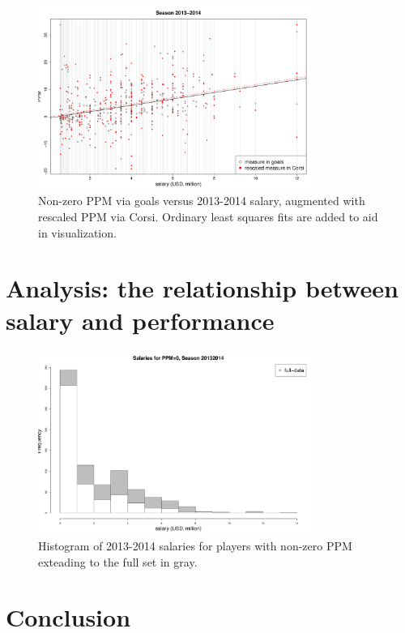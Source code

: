 \begin{figure}[htb!]
    \centering
    \includegraphics[width=0.8\textwidth]{figures/ppmsal-scat.pdf}
    \caption{Non-zero PPM via goals versus 2013-2014 salary, augmented with rescaled PPM via Corsi. Ordinary least squares fits are added to aid in visualization.}\label{fig:ppmsal-scat}
\end{figure}

\section{Analysis: the relationship between salary and performance}
\label{sec:salary}


\begin{figure}[htb!]
	\centering
	\includegraphics[width=0.8\textwidth]{figures/salaryhist.pdf}
	\caption{Histogram of 2013-2014 salaries for players with non-zero PPM exteading to the full set in gray.}\label{fig:salaryhist}
\end{figure}


\section{Conclusion}\label{sec:conclusion}

